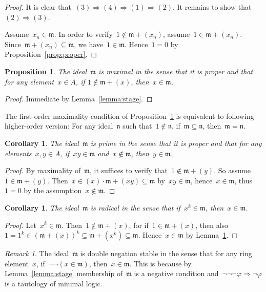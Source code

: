 \documentclass[oneside,reqno]{amsart}
\theoremstyle{definition}
\theoremstyle{plain}
\newtheorem{prop}[defn]{Proposition}
\newtheorem{cor}[defn]{Corollary}
\theoremstyle{remark}
\newtheorem{rem}[defn]{Remark}
\newcommand{\mmm}{\mathfrak{m}}
\newcommand{\nnn}{\mathfrak{n}}
\renewcommand{\_}{\mathpunct{.}\,}
\begin{document}
\begin{proof}It is clear that~$(3) \Rightarrow (4) \Rightarrow (1) \Rightarrow
(2)$. It remains to show that~$(2) \Rightarrow (3)$.

Assume~$x_n \in \mmm$. In order to verify~$1 \not\in \mmm + (x_n)$,
assume~$1 \in \mmm + (x_n)$. Since~$\mmm + (x_n) \subseteq \mmm$,
we have~$1 \in \mmm$. Hence~$1 = 0$ by Proposition~\ref{prop:proper}.\end{proof}

\begin{prop}\label{prop:is-maximal}The ideal~$\mmm$ is \emph{maximal} in the sense that it is proper and that for
any element~$x \in A$, if $1 \not\in \mmm + (x)$, then~$x \in \mmm$.\end{prop}

\begin{proof}Immediate by Lemma~\ref{lemma:stage}.\end{proof}

The first-order maximality condition of Proposition~\ref{prop:is-maximal} is
equivalent to following higher-order version: For any ideal~$\nnn$ such that~$1
\not\in \nnn$, if~$\mmm \subseteq \nnn$, then~$\mmm = \nnn$.

\begin{cor}The ideal~$\mmm$ is \emph{prime} in the sense that it is proper and that for
any elements~$x,y \in A$, if~$xy \in \mmm$ and~$x \not\in \mmm$, then~$y \in
\mmm$.\end{cor}

\begin{proof}By maximality of~$\mmm$, it suffices to verify that~$1 \not\in
\mmm + (y)$. So assume~$1 \in \mmm + (y)$. Then~$x \in (x) \cdot \mmm + (xy)
\subseteq \mmm$ by~$xy \in \mmm$, hence~$x \in \mmm$, thus~$1 = 0$ by the assumption~$x \not\in
\mmm$.\end{proof}

\begin{cor}The ideal~$\mmm$ is \emph{radical} in the sense that if~$x^k \in
\mmm$, then~$x \in \mmm$.\end{cor}

\begin{proof}Let~$x^k \in \mmm$. Then~$1 \not\in \mmm + (x)$, for if~$1 \in
\mmm + (x)$, then also~$1 = 1^k \in (\mmm + (x))^k \subseteq \mmm + (x^k)
\subseteq \mmm$. Hence~$x \in \mmm$ by Lemma~\ref{prop:is-maximal}.\end{proof}

\begin{rem}The ideal~$\mmm$ is double negation stable in the sense that for any
ring element~$x$, if~$\neg\neg(x \in \mmm)$, then~$x \in \mmm$. This is because
by Lemma~\ref{lemma:stage} membership of~$\mmm$ is a negative condition
and~$\neg\neg\neg\varphi \Rightarrow \neg\varphi$ is a tautology of minimal
logic.\end{rem}
\end{document}
